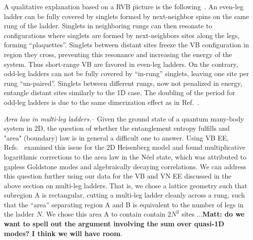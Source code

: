 \documentclass[prl,aps,twocolumn,floatfix,amsmath,amssymb,superscriptaddress,tightenlines]{revtex4}
\begin{document}
A qualitative explanation based on a RVB picture is the
following~\cite{White1994}. An even-leg ladder can be fully covered by
singlets formed by next-neighbor spins on the same rung of the ladder.
Singlets in neighboring rungs can then resonate to configurations where
singlets are formed by next-neighbors sites along the legs, forming
``plaquettes''. Singlets between distant sites freeze the VB configuration
in region they cross, preventing
this resonance and increasing the energy of the system.  Thus short-range
VB are favored in even-leg ladders.  
On the contrary,
odd-leg ladders can not be fully covered by ``in-rung'' singlets, leaving
one site per rung ``un-paired''.  Singlets between different rungs, now
not penalized in energy, entangle distant sites similarly to the 1D case.
The doubling of the period for odd-leg ladders is due to the same
dimerization effect as in Ref.~\cite{Ian1}.
 
{\it Area law in multi-leg ladders.}--  
Given the ground state of a
quantum many-body system in 2D, the question of whether the entanglement
entropy fulfills and "area" (boundary) law is in general a difficult one
to answer.  
Using VB EE, Refs.~\cite{Alet,Chh} examined this issue for the 2D Heisenberg model and found
multiplicative logarithmic corrections to the area law in the N\'eel
state, which was attributed to gapless Goldstone modes and
algebraically decaying correlations.  
We can address this question further using our data for the VB and VN EE discussed 
in the above section on multi-leg ladders.  That is, we chose a lattice
geometry such that subregion A is rectangular, cutting a multi-leg ladder
cleanly across a rung, such that the ``area'' separating region A and B is
equivalent to the number of legs in the ladder $N$.  We chose this area A
to contain contain $2N^2$ sites ...{\bf Matt: do we want to spell out the
argument involving the sum over quasi-1D modes?  I think we will have
room}.
\end{document}
